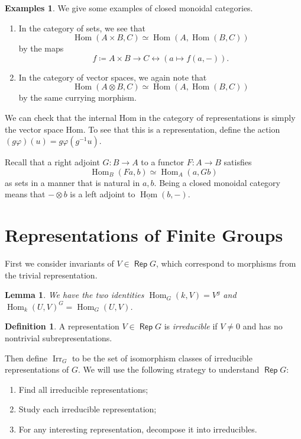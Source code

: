 \documentclass[leqno, openany]{memoir}
\newtheorem{lem}[thm]{Lemma}
\theoremstyle{definition}
\newtheorem{defn}[thm]{Definition}
\newtheorem{exms}[thm]{Examples}
\theoremstyle{remark}
\theoremstyle{plain}
\theoremstyle{definition}
\theoremstyle{remark}
\DeclareMathOperator{\Irr}{\mathrm{Irr}}
\DeclareMathOperator{\Rep}{\mathsf{Rep}}
\DeclareMathOperator{\Hom}{Hom}
\begin{document}
\begin{exms}
    We give some examples of closed monoidal categories. 
    \begin{enumerate}
        \item In the category of sets, we see that
            \[ \Hom(A \times B, C) \simeq \Hom(A, \Hom(B,C)) \]
            by the maps
            \[ f \coloneqq A \times B \to C \leftrightarrow (a \mapsto f(a,-)). \]
        \item In the category of vector spaces, we again note that
            \[ \Hom(A \otimes B, C) \simeq \Hom(A, \Hom(B,C)) \]
            by the same currying morphism.
    \end{enumerate}
\end{exms}

We can check that the internal Hom in the category of representations is simply the vector space Hom. To see that this is a representation, define the action $(g \varphi)(u) = g \varphi(g^{-1}u)$.

Recall that a right adjoint $G: B \to A$ to a functor $F:A \to B$ satisfies
\[ \Hom_B(Fa, b) \simeq \Hom_A(a,Gb) \]
as sets in a manner that is natural in $a,b$. Being a closed monoidal category means that $- \otimes b$ is a left adjoint to $\underline{\Hom}(b,-)$.

\section{Representations of Finite Groups}%
\label{sec:representations_of_finite_groups}

First we consider invariants of $V \in \Rep G$, which correspond to morphisms from the trivial representation.

\begin{lem}
    We have the two identities $\Hom_G(k,V) = V^g$ and $\Hom_k(U,V)^G = \Hom_G(U,V)$.
\end{lem}

\begin{defn}
    A representation $V \in \Rep G$ is \textit{irreducible} if $V \neq 0$ and has no nontrivial subrepresentations.
\end{defn}

Then define $\Irr_G$ to be the set of isomorphism classes of irreducible representations of $G$. We will use the following strategy to understand $\Rep G$:
\begin{enumerate}
    \item Find all irreducible representations;
    \item Study each irreducible representation;
    \item For any interesting representation, decompose it into irreducibles.
\end{enumerate}
\end{document}
